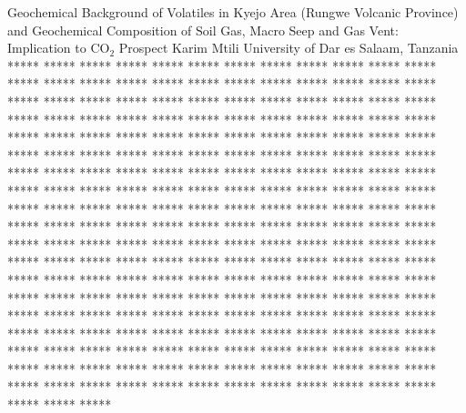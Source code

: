 \begin{conf-abstract}
{Geochemical Background of Volatiles in Kyejo Area (Rungwe Volcanic Province) and Geochemical Composition of Soil Gas, Macro Seep and Gas Vent: Implication to CO$_2$ Prospect}
{Karim Mtili}
{University of Dar es Salaam, Tanzania}
{***** ***** ***** ***** ***** ***** ***** ***** ***** ***** ***** ***** ***** ***** ***** ***** ***** ***** ***** ***** ***** ***** ***** ***** ***** ***** ***** ***** ***** ***** ***** ***** ***** ***** ***** ***** ***** ***** ***** ***** ***** ***** ***** ***** ***** ***** ***** ***** ***** ***** ***** ***** ***** ***** ***** ***** ***** ***** ***** ***** ***** ***** ***** ***** ***** ***** ***** ***** ***** ***** ***** ***** ***** ***** ***** ***** ***** ***** ***** ***** ***** ***** ***** ***** ***** ***** ***** ***** ***** ***** ***** ***** ***** ***** ***** ***** ***** ***** ***** ***** ***** ***** ***** ***** ***** ***** ***** ***** ***** ***** ***** ***** ***** ***** ***** ***** ***** ***** ***** ***** ***** ***** ***** ***** ***** ***** ***** ***** ***** ***** ***** ***** ***** ***** ***** ***** ***** ***** ***** ***** ***** ***** ***** ***** ***** ***** ***** ***** ***** ***** ***** ***** ***** ***** ***** ***** ***** ***** ***** ***** ***** ***** ***** ***** ***** ***** ***** ***** ***** ***** ***** ***** ***** ***** ***** ***** ***** ***** ***** ***** ***** ***** ***** ***** ***** ***** ***** ***** ***** ***** ***** ***** ***** ***** ***** ***** ***** ***** ***** ***** ***** ***** ***** ***** ***** ***** ***** ***** ***** ***** ***** ***** ***** ***** ***** ***** ***** ***** ***** ***** ***** ***** ***** ***** ***** ***** ***** ***** ***** ***** *****}
\end{conf-abstract}
